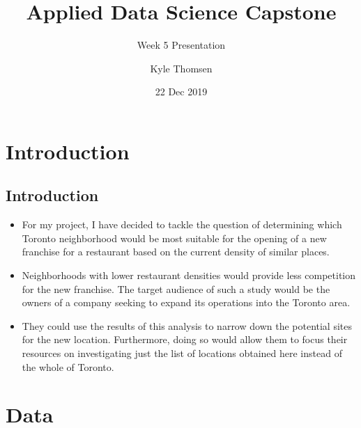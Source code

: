 \documentclass[aspectratio=169]{beamer}
\title{Applied Data Science Capstone}
\subtitle{Week 5 Presentation}
\author{Kyle Thomsen}
\date{22 Dec 2019}
\begin{document}
\maketitle




\section{Introduction}
\subsection{Introduction}
\begin{frame}


\begin{itemize}
 \item For my project, I have decided to tackle the question of determining which Toronto neighborhood would be most suitable for the opening of a new franchise for a restaurant based on the current density of similar places.
 \item Neighborhoods with lower restaurant densities would provide less competition for the new franchise. The target audience of such a study would be the owners of a company seeking to expand its operations into the Toronto area.
 \item They could use the results of this analysis to narrow down the potential sites for the new location. Furthermore, doing so would allow them to focus their resources on investigating just the list of locations obtained here instead of the whole of Toronto.
\end{itemize}

\end{frame}




  
\section{Data}
\end{document}
